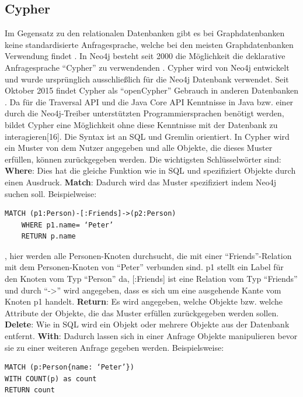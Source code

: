 \subsection{Cypher}
Im Gegensatz zu den relationalen Datenbanken gibt es bei Graphdatenbanken keine standardisierte Anfragesprache, welche bei den meisten Graphdatenbanken Verwendung findet \parencite{han2011survey}. In Neo4j besteht seit 2000 die Möglichkeit die deklarative Anfragesprache “Cypher” zu verwendenden  \parencite{francis2018cypher}. Cypher wird von Neo4j entwickelt und wurde ursprünglich ausschließlich für die Neo4j Datenbank verwendet. Seit Oktober 2015  findet Cypher als “openCypher” Gebrauch in anderen Datenbanken \parencite{francis2018cypher}. Da für die Traversal API und die Java Core API Kenntnisse in Java bzw. einer durch die Neo4j-Treiber unterstützten Programmiersprachen benötigt werden, bildet Cypher eine Möglichkeit ohne diese Kenntnisse mit der Datenbank zu interagieren[16]. Die Syntax ist an SQL und Gremlin \parencite{vukotic2015neo4j} orientiert. In Cypher wird ein Muster von dem Nutzer angegeben und alle Objekte, die dieses Muster erfüllen, können zurückgegeben werden. Die wichtigsten  Schlüsselwörter sind: \newline
\textbf{Where}: Dies hat die gleiche Funktion wie in SQL und spezifiziert Objekte durch einen Ausdruck. \newline
\textbf{Match}: Dadurch wird das Muster spezifiziert indem Neo4j suchen soll. Beispielweise: 
\begin{Verbatim}[frame=single]
	MATCH (p1:Person)-[:Friends]->(p2:Person) 
	WHERE p1.name= ‘Peter’ 
	RETURN p.name
\end{Verbatim}
 , hier werden alle Personen-Knoten durchsucht, die mit einer “Friends”-Relation mit dem Personen-Knoten von “Peter” verbunden sind. p1 stellt ein Label für den Knoten vom Typ “Person” da, [:Friends] ist eine Relation vom Typ “Friends” und durch “->” wird angegeben, dass es sich um eine ausgehende Kante vom Knoten p1 handelt. \newline
\textbf{Return}: Es wird angegeben, welche Objekte bzw. welche Attribute der Objekte, die das Muster erfüllen zurückgegeben werden sollen.\newline
\textbf{Delete}: Wie in SQL  wird ein Objekt  oder mehrere Objekte aus der Datenbank entfernt.\newline
\textbf{With}: Dadurch lassen sich in einer Anfrage Objekte manipulieren bevor sie zu einer weiteren Anfrage gegeben werden. Beispielsweise:
\begin{Verbatim}[frame=single]
MATCH (p:Person{name: ‘Peter’})  
WITH COUNT(p) as count  
RETURN count
\end{Verbatim} 
